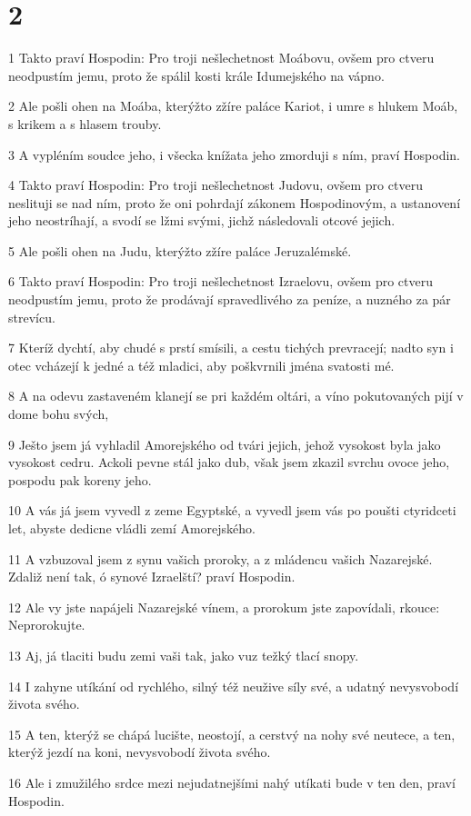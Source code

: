 \chapter{2}

\par 1 Takto praví Hospodin: Pro troji nešlechetnost Moábovu, ovšem pro ctveru neodpustím jemu, proto že spálil kosti krále Idumejského na vápno.
\par 2 Ale pošli ohen na Moába, kterýžto zžíre paláce Kariot, i umre s hlukem Moáb, s krikem a s hlasem trouby.
\par 3 A vypléním soudce jeho, i všecka knížata jeho zmorduji s ním, praví Hospodin.
\par 4 Takto praví Hospodin: Pro troji nešlechetnost Judovu, ovšem pro ctveru neslituji se nad ním, proto že oni pohrdají zákonem Hospodinovým, a ustanovení jeho neostríhají, a svodí se lžmi svými, jichž následovali otcové jejich.
\par 5 Ale pošli ohen na Judu, kterýžto zžíre paláce Jeruzalémské.
\par 6 Takto praví Hospodin: Pro troji nešlechetnost Izraelovu, ovšem pro ctveru neodpustím jemu, proto že prodávají spravedlivého za peníze, a nuzného za pár strevícu.
\par 7 Kteríž dychtí, aby chudé s prstí smísili, a cestu tichých prevracejí; nadto syn i otec vcházejí k jedné a též mladici, aby poškvrnili jména svatosti mé.
\par 8 A na odevu zastaveném klanejí se pri každém oltári, a víno pokutovaných pijí v dome bohu svých,
\par 9 Ješto jsem já vyhladil Amorejského od tvári jejich, jehož vysokost byla jako vysokost cedru. Ackoli pevne stál jako dub, však jsem zkazil svrchu ovoce jeho, pospodu pak koreny jeho.
\par 10 A vás já jsem vyvedl z zeme Egyptské, a vyvedl jsem vás po poušti ctyridceti let, abyste dedicne vládli zemí Amorejského.
\par 11 A vzbuzoval jsem z synu vašich proroky, a z mládencu vašich Nazarejské. Zdaliž není tak, ó synové Izraelští? praví Hospodin.
\par 12 Ale vy jste napájeli Nazarejské vínem, a prorokum jste zapovídali, rkouce: Neprorokujte.
\par 13 Aj, já tlaciti budu zemi vaši tak, jako vuz težký tlací snopy.
\par 14 I zahyne utíkání od rychlého, silný též neužive síly své, a udatný nevysvobodí života svého.
\par 15 A ten, kterýž se chápá lucište, neostojí, a cerstvý na nohy své neutece, a ten, kterýž jezdí na koni, nevysvobodí života svého.
\par 16 Ale i zmužilého srdce mezi nejudatnejšími nahý utíkati bude v ten den, praví Hospodin.

